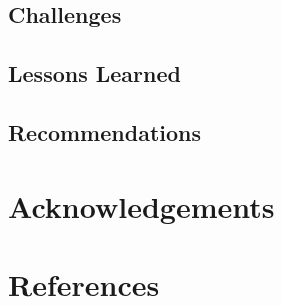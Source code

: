 \documentclass[a4paper,12pt,twoside]{article}
\begin{document}
    \begin{multicols}{2}
    \lipsum[0-5]
    \end{multicols}

\subsection{Challenges}

    \begin{multicols}{2}
    \lipsum[0-5]
    \end{multicols}

\subsection{Lessons Learned}

    \begin{multicols}{2}
    \lipsum[0-5]
    \end{multicols}
    
\subsection{Recommendations}

    \begin{multicols}{2}
    \lipsum[0-5]
    \end{multicols}

\section{Acknowledgements}

    \begin{multicols}{2}
    \lipsum[0-5]
    \end{multicols}

\section{References}

    \begin{multicols}{2}
    \lipsum[0-5]
    \end{multicols}
\end{document}

